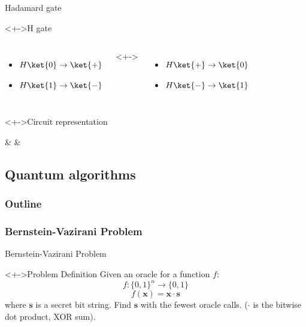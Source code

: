 \documentclass{beamer}
\begin{document}
\begin{frame}{Hadamard gate}
	\begin{block}<+->{H gate}
			\begin{columns}[T,onlytextwidth]
					\begin{itemize}
						\item $H\ket{0} \rightarrow \ket{+}$
						\item $H\ket{1} \rightarrow \ket{-}$
					\end{itemize}
				<+->
					\begin{itemize}
						\item $H\ket{+} \rightarrow \ket{0}$
						\item $H\ket{-} \rightarrow \ket{1}$
					\end{itemize}
			\end{columns}
	\end{block}
	\begin{block}<+->{Circuit representation}
			\centering
			\begin{quantikz}
					\lstick{$\ket{\psi}$} &  & \meter{}
			\end{quantikz}
	\end{block}
\end{frame}

\subsection{Quantum algorithms}
\begin{frame}
  \frametitle{Outline}
\end{frame}

\subsubsection*{Bernstein-Vazirani Problem}
\begin{frame}{Bernstein-Vazirani Problem}
\begin{linenumbers}
  \begin{block}<+->{Problem Definition}
    Given an oracle for a function $f$:
    \[ f : \{0, 1\}^n \rightarrow \{0, 1\} \]
    \[ f(\mathbf{x}) = \mathbf{x} \cdot \mathbf{s} \]
    where $\mathbf{s}$ is a secret bit string. Find $\mathbf{s}$ with the fewest oracle calls.  ($\cdot$ is the bitwise dot product, XOR sum).
  \end{block}
\end{linenumbers}
\end{frame}
\end{document}
